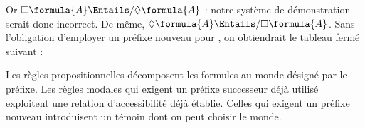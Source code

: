 \documentclass[../../../include/open-logic-section]{subfiles}
\begin{document}
Or $\Box \formula{A} \Entails/ \Diamond \formula{A}$ : notre système
de démonstration serait donc incorrect. De même,
$\Diamond \formula{A} \Entails/ \Box \formula{A}$. Sans l'obligation
d'employer un préfixe nouveau pour
,
on obtiendrait le tableau fermé suivant : 
\begin{explain}
Les règles propositionnelles décomposent les formules au monde
désigné par le préfixe. Les règles modales qui exigent un préfixe
successeur déjà utilisé exploitent une relation d'accessibilité
déjà établie. Celles qui exigent un préfixe nouveau introduisent
un témoin dont on peut choisir le monde.
\end{explain}
\end{document}
